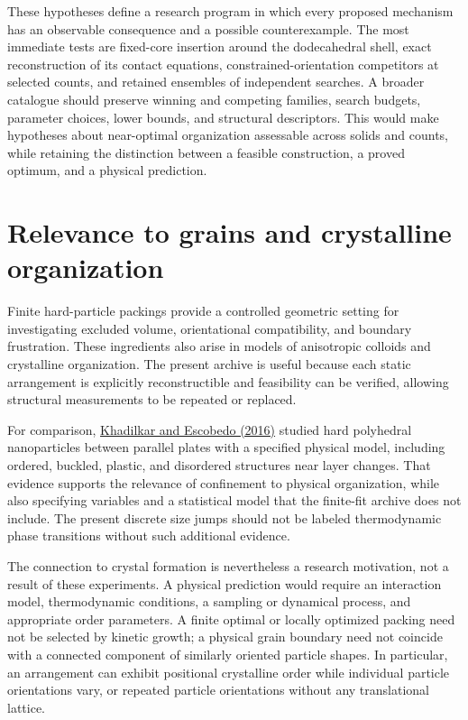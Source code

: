 \documentclass[11pt,a4paper]{article}
\begin{document}
These hypotheses define a research program in which every proposed mechanism has an observable consequence and a possible counterexample. The most immediate tests are fixed-core insertion around the dodecahedral shell, exact reconstruction of its contact equations, constrained-orientation competitors at selected counts, and retained ensembles of independent searches. A broader catalogue should preserve winning and competing families, search budgets, parameter choices, lower bounds, and structural descriptors. This would make hypotheses about near-optimal organization assessable across solids and counts, while retaining the distinction between a feasible construction, a proved optimum, and a physical prediction.

\section{Relevance to grains and crystalline organization}

Finite hard-particle packings provide a controlled geometric setting for investigating excluded volume, orientational compatibility, and boundary frustration. These ingredients also arise in models of anisotropic colloids and crystalline organization. The present archive is useful because each static arrangement is explicitly reconstructible and feasibility can be verified, allowing structural measurements to be repeated or replaced.

For comparison, \href{https://doi.org/10.1039/C5SM02570B}{Khadilkar and Escobedo (2016)} studied hard polyhedral nanoparticles between parallel plates with a specified physical model, including ordered, buckled, plastic, and disordered structures near layer changes. That evidence supports the relevance of confinement to physical organization, while also specifying variables and a statistical model that the finite-fit archive does not include. The present discrete size jumps should not be labeled thermodynamic phase transitions without such additional evidence.

The connection to crystal formation is nevertheless a research motivation, not a result of these experiments. A physical prediction would require an interaction model, thermodynamic conditions, a sampling or dynamical process, and appropriate order parameters. A finite optimal or locally optimized packing need not be selected by kinetic growth; a physical grain boundary need not coincide with a connected component of similarly oriented particle shapes. In particular, an arrangement can exhibit positional crystalline order while individual particle orientations vary, or repeated particle orientations without any translational lattice.
\end{document}
